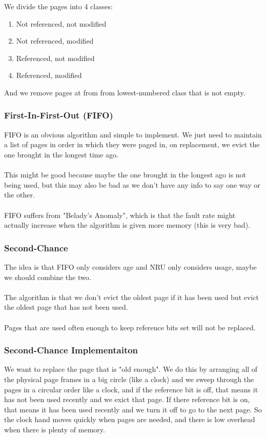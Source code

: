 \documentclass{article}
\begin{document}
We divide the pages into 4 classes:
\begin{enumerate}
    \item Not referenced, not modified
    \item Not referenced, modified
    \item Referenced, not modified
    \item Referenced, modified
\end{enumerate}

And we remove pages at from from lowest-numbered class that is not empty.

\subsubsection{First-In-First-Out (FIFO)}

FIFO is an obvious algorithm and simple to implement. We just need to maintain a list of pages in order in which they were paged in, on replacement, we evict the one brought in the longest time ago.\\
\\
This might be good because maybe the one brought in the longest ago is not being used, but this may also be bad as we don't have any info to say one way or the other.\\
\\
FIFO suffers from "Belady's Anomaly", which is that the fault rate might actually increase when the algorithm is given more memory (this is very bad).

\subsubsection{Second-Chance}

The idea is that FIFO only considers age and NRU only considers usage, maybe we should combine the two.\\
\\
The algorithm is that we don't evict the oldest page if it has been used but evict the oldest page that has not been used.\\
\\
Pages that are used often enough to keep reference bits set will not be replaced.

\subsubsection{Second-Chance Implementaiton}

We want to replace the page that is "old enough". We do this by arranging all of the physical page frames in a big circle (like a clock) and we sweep through the pages in a circular order like a clock, and if the reference bit is off, that means it has not been used recently and we exict that page. If there reference bit is on, that means it has been used recently and we turn it off to go to the next page. So the clock hand moves quickly when pages are needed, and there is low overhead when there is plenty of memory.
\end{document}
